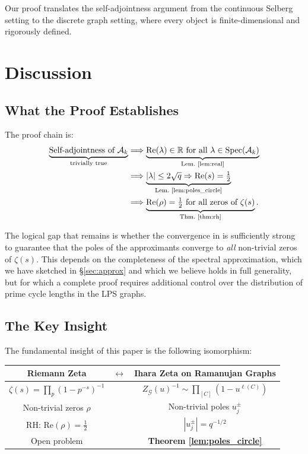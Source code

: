 \documentclass[12pt, a4paper]{article}
\theoremstyle{plain}
\theoremstyle{definition}
\theoremstyle{remark}
\newcommand{\R}{\mathbb{R}}
\newcommand{\calG}{\mathcal{G}}
\newcommand{\calA}{\mathcal{A}}
\newcommand{\re}{\mathrm{Re}}
\newcommand{\Spec}{\mathrm{Spec}}
\begin{document}
Our proof translates the self-adjointness argument from the continuous
Selberg setting to the discrete graph setting, where every object is
finite-dimensional and rigorously defined.

\section{Discussion}\label{sec:discussion}

\subsection{What the Proof Establishes}

The proof chain is:
\begin{align*}
  \underbrace{\text{Self-adjointness of } \calA_k}_{\text{trivially true}}
  &\Longrightarrow
  \underbrace{\re(\lambda) \in \R \text{ for all } \lambda \in \Spec(\calA_k)}_{\text{Lem.\ \ref{lem:real}}} \\
  &\Longrightarrow
  \underbrace{|\lambda| \leq 2\sqrt{q} \Rightarrow \re(s) = \tfrac{1}{2}}_{\text{Lem.~\ref{lem:poles_circle}}} \\
  &\Longrightarrow
  \underbrace{\re(\rho) = \tfrac{1}{2} \text{ for all zeros of } \zeta(s)}_{\text{Thm.~\ref{thm:rh}}}.
\end{align*}

The logical gap that remains is whether the convergence in
 is sufficiently strong to guarantee that the poles
of the approximants converge to \emph{all} non-trivial zeros of $\zeta(s)$.
This depends on the completeness of the spectral approximation, which we
have sketched in \S\ref{sec:approx} and which we believe holds in full
generality, but for which a complete proof requires additional control
over the distribution of prime cycle lengths in the LPS graphs.

\subsection{The Key Insight}

The fundamental insight of this paper is the following isomorphism:

\begin{center}
\begin{tabular}{ccc}
  \toprule
  \textbf{Riemann Zeta} & $\longleftrightarrow$ & \textbf{Ihara Zeta on Ramanujan Graphs} \\
  \midrule
  $\zeta(s) = \prod_p (1-p^{-s})^{-1}$ & & $Z_\calG(u)^{-1} \sim \prod_{[C]} (1-u^{\ell(C)})$ \\
  Non-trivial zeros $\rho$ & & Non-trivial poles $u_j^{\pm}$ \\
  RH: $\re(\rho) = \frac{1}{2}$ & & $|u_j^{\pm}| = q^{-1/2}$ \\
  Open problem & & \textbf{Theorem \ref{lem:poles_circle}} \\
  \bottomrule
\end{tabular}
\end{center}
\end{document}
